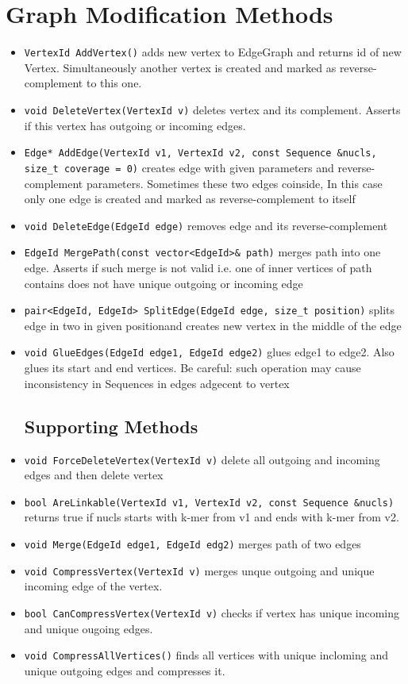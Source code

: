 \documentclass[a4paper,10pt]{article}
\begin{document}
\section*{Graph Modification Methods}
\begin{itemize}
\item \texttt{VertexId AddVertex()} adds new vertex to EdgeGraph and returns id of new Vertex.
Simultaneously another vertex is created and marked as reverse-complement to this one.
\item \texttt{void DeleteVertex(VertexId v)} deletes vertex and its complement. Asserts if this vertex has outgoing or incoming
edges.
\item \texttt{Edge* AddEdge(VertexId v1, VertexId v2, const Sequence \&nucls, size\_t coverage = 0)} creates edge with given parameters
and reverse-complement parameters. Sometimes these two edges coinside, In this case only one edge is created and marked as 
reverse-complement to itself
\item \texttt{void DeleteEdge(EdgeId edge)} removes edge and its reverse-complement
\item \texttt{EdgeId MergePath(const vector<EdgeId>\& path)} merges path into one edge. Asserts if such merge is not valid i.e.
one of inner vertices of path contains does not have unique outgoing or incoming edge
\item \texttt{pair<EdgeId, EdgeId> SplitEdge(EdgeId edge, size\_t position)} splits edge in two in given positionand creates new 
vertex in the middle of the edge
\item \texttt{void GlueEdges(EdgeId edge1, EdgeId edge2)} glues edge1 to edge2. Also glues its start and end vertices. Be careful:
such operation may cause inconsistency in Sequences in edges adgecent to vertex
\subsection*{Supporting Methods}
\item \texttt{void ForceDeleteVertex(VertexId v)} delete all outgoing and incoming edges and then delete vertex
\item \texttt{bool AreLinkable(VertexId v1, VertexId v2, const Sequence \&nucls)} returns true if nucls starts with k-mer from v1 and
ends with k-mer from v2.
\item \texttt{void Merge(EdgeId edge1, EdgeId edg2)} merges path of two edges
\item \texttt{void CompressVertex(VertexId v)} merges unque outgoing and unique incoming edge of the vertex.
\item \texttt{bool CanCompressVertex(VertexId v)} checks if vertex has unique incoming and unique ougoing edges.
\item \texttt{void CompressAllVertices()} finds all vertices with unique incloming and unique outgoing edges and compresses it.
\end{itemize}
\end{document}
